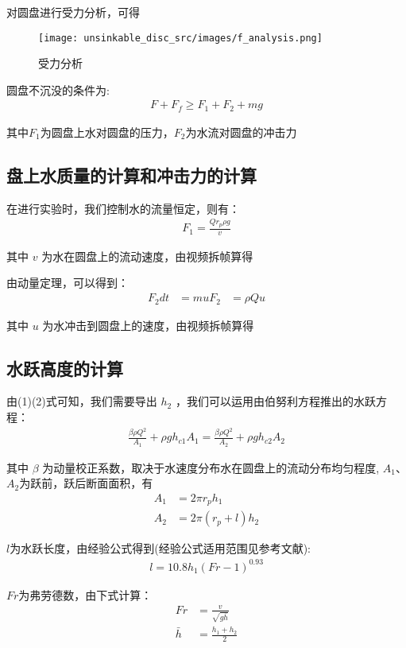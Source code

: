 \documentclass[UTF8]{gapd}
\begin{document}
对圆盘进行受力分析，可得
\begin{figure}[!htbp]%
  \centering
  \texttt{[image: unsinkable\_disc\_src/images/f\_analysis.png]}
  \caption{受力分析} 
  \label{fig:unsinkable_disc_force_analysis}%
\end{figure}

圆盘不沉没的条件为:
\begin{align}
    F+F_f\ge F_1+F_2+mg 
\end{align}

其中$F_1$为圆盘上水对圆盘的压力，$F_2$为水流对圆盘的冲击力
\subsection{盘上水质量的计算和冲击力的计算}
在进行实验时，我们控制水的流量恒定，则有：
\begin{align}
    F_1=\frac{Qr_p\rho g}{v}
\end{align}

其中 $v$ 为水在圆盘上的流动速度，由视频拆帧算得

由动量定理，可以得到：
\begin{align}
    F_2dt&=mu
    F_2&=\rho Q u
\end{align}

其中 $u$  为水冲击到圆盘上的速度，由视频拆帧算得
\subsection{水跃高度的计算}
由(1)(2)式可知，我们需要导出  $h_2$  ，我们可以运用由伯努利方程推出的水跃方程\cite{article:1}：
\begin{align}
    \frac{\beta \rho Q^2}{A_1}+\rho g h_{c1}A_1=\frac{\beta \rho Q^2}{A_2}+\rho g h_{c2}A_2
\end{align}

其中  $\beta$ 为动量校正系数，取决于水速度分布水在圆盘上的流动分布均匀程度,
$A_1$、$A_2$为跃前，跃后断面面积，有
\begin{align}
    A_1&=2\pi r_p h_1\\
    A_2&=2\pi(r_p+l)h_2
\end{align}

\noindent$l$为水跃长度，由经验公式得到(经验公式适用范围见参考文献\cite{book:1}):
\begin{align}
    l=10.8h_1(Fr-1)^{0.93}
\end{align}

\noindent$Fr$为弗劳德数，由下式计算\cite{article:2}：
\begin{align}
    Fr&=\frac{v}{\sqrt{g \bar{h}}}\\
    \bar{h}&=\frac{h_1+h_2}{2}
\end{align}
\end{document}
